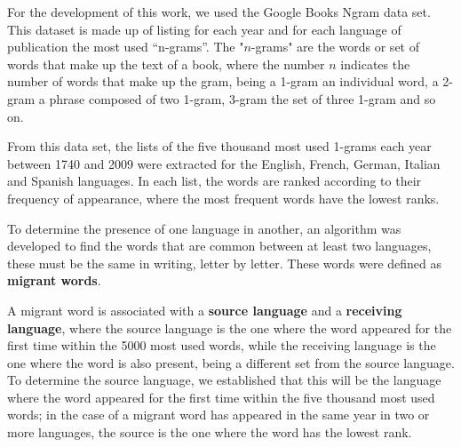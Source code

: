 \documentclass[10pt,letterpaper]{article} %
\begin{document}
For the development of this work,  we used the Google Books Ngram data set.
This dataset is made up of listing for each year and for each language of
publication the most used “n-grams”. The "$n$-grams" are the words or set of
words that make up the text of a book, where the number $n$ indicates the number
of words that make up the gram, being a 1-gram an individual word, a 2-gram a
phrase composed of two 1-gram, 3-gram the set of three 1-gram and so on.

From this data set, the lists of the five thousand most used 1-grams each year
between 1740 and 2009 were extracted for the English, French, German, Italian
and Spanish languages. In each list, the words are ranked according to their
frequency of appearance, where the most frequent words have the lowest ranks.

To determine the presence of one language in another, an algorithm was
developed to find the words that are common between at least two languages,
these must be the same in writing, letter by letter. These words were defined
as \textbf{migrant words}. 

A migrant word is associated with a \textbf{source language} and a
\textbf{receiving language}, where the source language is the one where the
word appeared for the first time within the 5000 most used words,
while the receiving language is the one where the word is also present, being a
different set from the source language.   To determine the source language, we
established that this will be the language where the word appeared for the
first time within the five thousand most used words; in the case of a migrant
word has appeared in the same year in two or more languages, the source is the
one where the word has the lowest rank.

\end{document}
